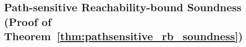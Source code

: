 \subsection{Path-sensitive Reachability-bound Soundness (Proof of Theorem~\ref{thm:pathsensitive_rb_soundness})}
\label{apdx:psrb-sound}

\clearpage

% 

